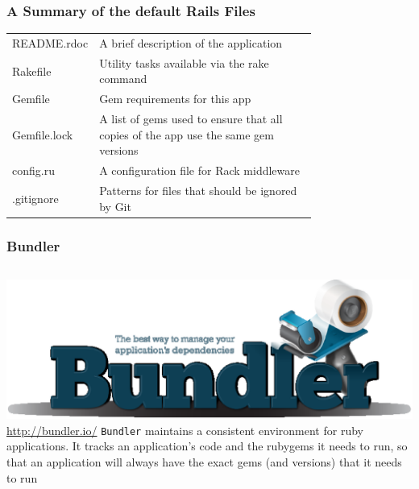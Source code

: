 \documentclass{beamer}
\newcommand{\commandinline}[1]{\lstinline[basicstyle=\small\lstfontfamily]{#1}}
\begin{document}
\begin{frame}
\frametitle{A Summary of the default Rails Files}
\begin{tabular}{lp{0.75 \linewidth}}
README.rdoc	& A brief description of the application\\
Rakefile	& Utility tasks available via the rake command\\
Gemfile	& Gem requirements for this app\\
Gemfile.lock	& A list of gems used to ensure that all copies of the app use the same gem versions\\
config.ru	& A configuration file for Rack middleware\\
.gitignore	& Patterns for files that should be ignored by Git\\
\end{tabular}
\end{frame}
\begin{frame}
\frametitle{Bundler}
\begin{columns}
\href{http://bundler.io//}{\includegraphics[width = 1.0 \textwidth]{gembundler.eps}}
\url{http://bundler.io/}
\commandinline{Bundler} maintains a consistent environment for ruby applications. It tracks an application's code and the rubygems it needs to run, so that an application will always have the exact gems (and versions) that it needs to run
\end{columns}
\end{frame}
\end{document}
